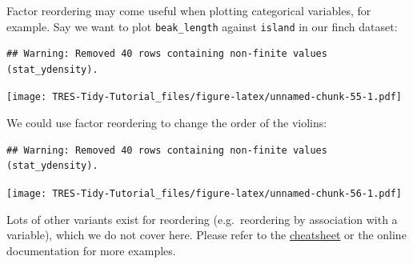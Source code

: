 \documentclass[]{book}
\newenvironment{Shaded}{}{}
\newcommand{\DataTypeTok}[1]{\textcolor[rgb]{0.56,0.13,0.00}{#1}}
\newcommand{\KeywordTok}[1]{\textcolor[rgb]{0.00,0.44,0.13}{\textbf{#1}}}
\newcommand{\NormalTok}[1]{#1}
\newcommand{\OperatorTok}[1]{\textcolor[rgb]{0.40,0.40,0.40}{#1}}
\newcommand{\StringTok}[1]{\textcolor[rgb]{0.25,0.44,0.63}{#1}}
\begin{document}
Factor reordering may come useful when plotting categorical variables, for example. Say we want to plot \texttt{beak\_length} against \texttt{island} in our finch dataset:

\begin{Shaded}
\end{Shaded}

\begin{verbatim}
## Warning: Removed 40 rows containing non-finite values (stat_ydensity).
\end{verbatim}

\texttt{[image: TRES-Tidy-Tutorial\_files/figure-latex/unnamed-chunk-55-1.pdf]}

We could use factor reordering to change the order of the violins:

\begin{Shaded}
\end{Shaded}

\begin{verbatim}
## Warning: Removed 40 rows containing non-finite values (stat_ydensity).
\end{verbatim}

\texttt{[image: TRES-Tidy-Tutorial\_files/figure-latex/unnamed-chunk-56-1.pdf]}

Lots of other variants exist for reordering (e.g.~reordering by association with a variable), which we do not cover here. Please refer to the \href{https://rstudio.com/resources/cheatsheets/}{cheatsheet} or the online documentation for more examples.
\end{document}
